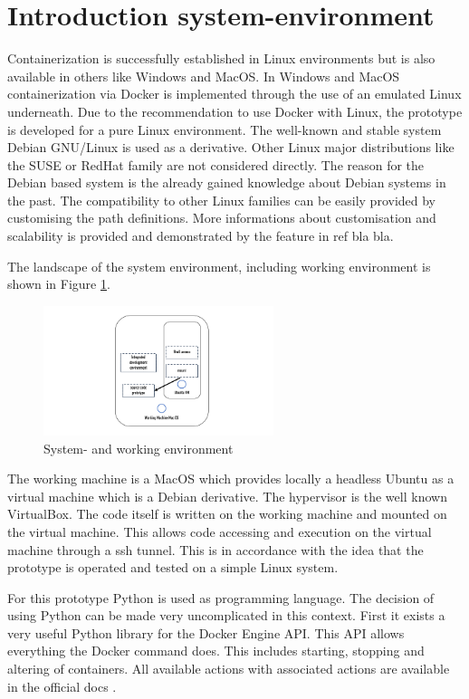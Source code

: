 \section{Introduction system-environment}
\label{ch:practical_realization:sys_env}

Containerization is successfully established in Linux environments but is also available in others like Windows and MacOS.
In Windows and MacOS containerization via Docker is implemented through the use of an emulated Linux underneath.
Due to the recommendation to use Docker with Linux, the prototype is developed for a pure Linux environment.
The well-known and stable system Debian GNU/Linux is used as a derivative. Other Linux major distributions like the SUSE or RedHat family are not considered directly. The reason for the Debian based system is the already gained knowledge about Debian systems in the past. The compatibility to other Linux families can be easily provided by customising the path definitions. More informations about customisation and scalability is provided and demonstrated by the feature in ref bla bla.

The landscape of the system environment, including working environment is shown in Figure \ref{fig:pract:sys_env}.
\begin{figure}[h!]
 \centering
 \includegraphics[width=0.6\textwidth]{gfx/examples/sys_env.png}
 \caption{System- and working environment}
 \label{fig:pract:sys_env}
\end{figure}
The working machine is a MacOS which provides locally a headless Ubuntu as a virtual machine which is a Debian derivative. The hypervisor is the well known VirtualBox.
The code itself is written on the working machine and mounted on the virtual machine. This allows code accessing and execution on the virtual machine through a ssh tunnel. This is in accordance with the idea that the prototype is operated and tested on a simple Linux system.

For this prototype Python is used as programming language. The decision of using Python can be made very uncomplicated in this context. First it exists a very useful Python library for the Docker Engine API. This API allows everything the Docker command does. This includes starting, stopping and altering of containers. All available actions with associated actions are available in the official docs \cite{python_sdk}. 


